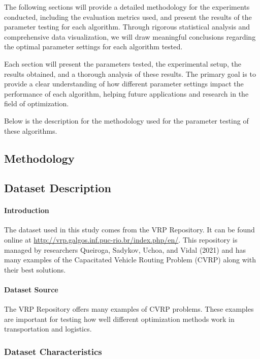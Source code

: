 \documentclass{article}
\begin{document}
    The following sections will provide a detailed methodology for the experiments conducted, including the evaluation metrics used, and present the results of the parameter testing for each algorithm. Through rigorous statistical analysis and comprehensive data visualization, we will draw meaningful conclusions regarding the optimal parameter settings for each algorithm tested.

    Each section will present the parameters tested, the experimental setup, the results obtained, and a thorough analysis of these results. The primary goal is to provide a clear understanding of how different parameter settings impact the performance of each algorithm, helping future applications and research in the field of optimization.

    \noindent Below is the description for the methodology used for the parameter testing of these algorithms.

    \subsection{Methodology}

    \subsection{Dataset Description}

    \paragraph{Introduction}
    The dataset used in this study comes from the VRP Repository.
    It can be found online at \url{http://vrp.galgos.inf.puc-rio.br/index.php/en/}.
    This repository is managed by researchers Queiroga, Sadykov, Uchoa, and Vidal (2021) and has many examples of the Capacitated Vehicle Routing Problem (CVRP) along with their best solutions.

    \paragraph{Dataset Source}
    The VRP Repository offers many examples of CVRP problems.
    These examples are important for testing how well different optimization methods work in transportation and logistics.

    \subsubsection{Dataset Characteristics}
\end{document}
